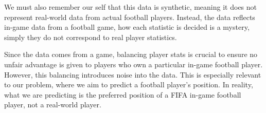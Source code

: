 \par
We must also remember our self that this data is synthetic, meaning it does not represent real-world data from actual football players.  
Instead, the data reflects in-game data from a football game, how each statistic is decided is a mystery, simply they do not correspond to real player statistics.
\par
Since the data comes from a game, balancing player stats is crucial to ensure no unfair advantage is given to players who own a particular in-game football player.
However, this balancing introduces noise into the data.
This is especially relevant to our problem, where we aim to predict a football player’s position. In reality, what we are predicting is the preferred position of a FIFA in-game football player, not a real-world player.





